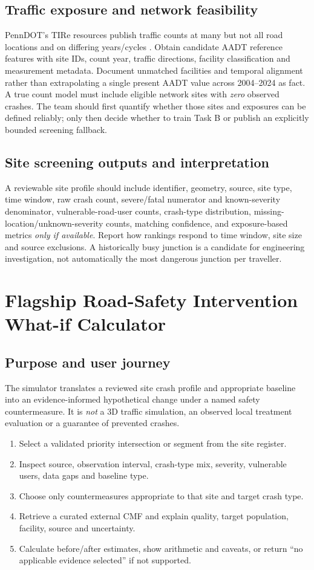 \documentclass[11pt,a4paper,openany]{report}
\begin{document}
\section{Traffic exposure and network feasibility}
PennDOT's TIRe resources publish traffic counts at many but not all road locations and on differing years/cycles \cite{TIRe}. Obtain candidate AADT reference features with site IDs, count year, traffic directions, facility classification and measurement metadata. Document unmatched facilities and temporal alignment rather than extrapolating a single present AADT value across 2004--2024 as fact. A true count model must include eligible network sites with \emph{zero} observed crashes. The team should first quantify whether those sites and exposures can be defined reliably; only then decide whether to train Task B or publish an explicitly bounded screening fallback.

\section{Site screening outputs and interpretation}
A reviewable site profile should include identifier, geometry, source, site type, time window, raw crash count, severe/fatal numerator and known-severity denominator, vulnerable-road-user counts, crash-type distribution, missing-location/unknown-severity counts, matching confidence, and exposure-based metrics \emph{only if available}. Report how rankings respond to time window, site size and source exclusions. A historically busy junction is a candidate for engineering investigation, not automatically the most dangerous junction per traveller.

\chapter{Flagship Road-Safety Intervention What-if Calculator}
\section{Purpose and user journey}
The simulator translates a reviewed site crash profile and appropriate baseline into an evidence-informed hypothetical change under a named safety countermeasure. It is \emph{not} a 3D traffic simulation, an observed local treatment evaluation or a guarantee of prevented crashes.
\begin{enumerate}
\item Select a validated priority intersection or segment from the site register.
\item Inspect source, observation interval, crash-type mix, severity, vulnerable users, data gaps and baseline type.
\item Choose only countermeasures appropriate to that site and target crash type.
\item Retrieve a curated external CMF and explain quality, target population, facility, source and uncertainty.
\item Calculate before/after estimates, show arithmetic and caveats, or return ``no applicable evidence selected'' if not supported.
\end{enumerate}
\end{document}
